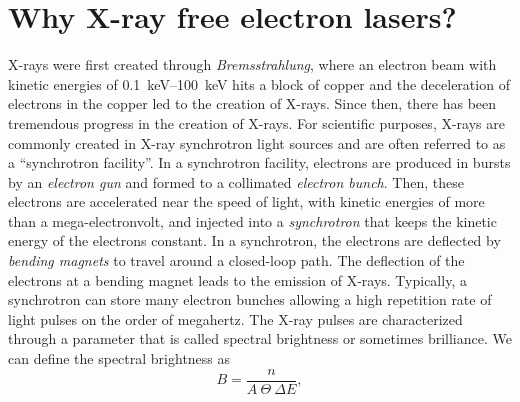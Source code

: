 \section{Why X-ray free electron lasers?}\label{sec:xfel}
X-rays were first created through \textit{Bremsstrahlung}, where an electron beam with kinetic energies of \SIrange{0.1}{100}{\kilo\electronvolt} hits a block of copper and the deceleration of electrons in the copper led to the creation of X-rays. Since then, there has been tremendous progress in the creation of X-rays. For scientific purposes, X-rays are commonly created in X-ray synchrotron light sources and are often referred to as a ``synchrotron facility''. In a synchrotron facility, electrons are produced in bursts by an \textit{electron gun} and formed to a collimated \textit{electron bunch}. Then, these electrons are accelerated near the speed of light, with kinetic energies of more than a mega-electronvolt, and injected into a \textit{synchrotron} that keeps the kinetic energy of the electrons constant. In a synchrotron, the electrons are deflected by \textit{bending magnets} to travel around a closed-loop path. The deflection of the electrons at a bending magnet leads to the emission of X-rays. Typically, a synchrotron can store many electron bunches allowing a high repetition rate of light pulses on the order of megahertz. The X-ray pulses are characterized through a parameter that is called spectral brightness \citep{Mills-2005-IUCR} or sometimes brilliance. We can define the spectral brightness as \citep{Als-Nielson-2011-JWS}
\begin{equation}
B = \frac{n}{A\ \Theta\ \Delta\! E},
\label{eq:spectral-brightness}
\end{equation}
